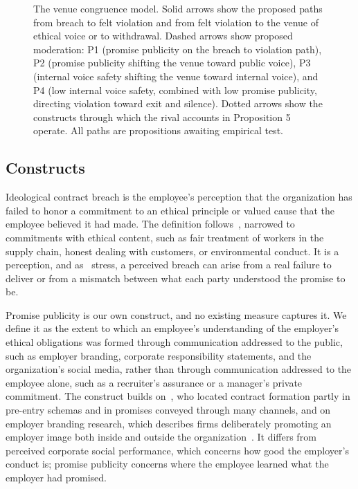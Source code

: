 \documentclass[12pt,a4paper]{article}
\theoremstyle{definition}
\begin{document}
\begin{figure}[htb]
{\begin{tikzpicture}
\end{tikzpicture}}
\caption{The venue congruence model. Solid arrows show the proposed paths from breach to felt violation and from felt violation to the venue of ethical voice or to withdrawal. Dashed arrows show proposed moderation: P1 (promise publicity on the breach to violation path), P2 (promise publicity shifting the venue toward public voice), P3 (internal voice safety shifting the venue toward internal voice), and P4 (low internal voice safety, combined with low promise publicity, directing violation toward exit and silence). Dotted arrows show the constructs through which the rival accounts in Proposition 5 operate. All paths are propositions awaiting empirical test.}\label{fig:model}
\end{figure}

\subsection{Constructs}

Ideological contract breach is the employee's perception that the organization has failed to honor a commitment to an ethical principle or valued cause that the employee believed it had made. The definition follows~\citet{thompson2003violations}, narrowed to commitments with ethical content, such as fair treatment of workers in the supply chain, honest dealing with customers, or environmental conduct. It is a perception, and as~\citet{morrison1997employees} stress, a perceived breach can arise from a real failure to deliver or from a mismatch between what each party understood the promise to be.

Promise publicity is our own construct, and no existing measure captures it. We define it as the extent to which an employee's understanding of the employer's ethical obligations was formed through communication addressed to the public, such as employer branding, corporate responsibility statements, and the organization's social media, rather than through communication addressed to the employee alone, such as a recruiter's assurance or a manager's private commitment. The construct builds on~\citet{rousseau2001schema}, who located contract formation partly in pre-entry schemas and in promises conveyed through many channels, and on employer branding research, which describes firms deliberately promoting an employer image both inside and outside the organization~\citep{backhaus2004conceptualizing}. It differs from perceived corporate social performance, which concerns how good the employer's conduct is; promise publicity concerns where the employee learned what the employer had promised.
\end{document}
